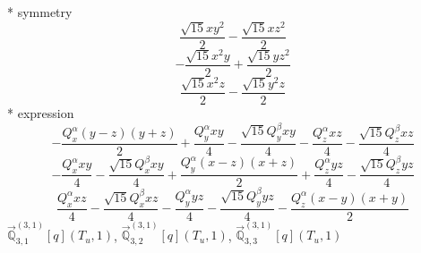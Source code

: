 \documentclass[fleqn,8pt]{jsarticle}
\begin{document}
\noindent\quad ** symmetry
\begin{dmath*}
\frac{\sqrt{15} x y^{2}}{2} - \frac{\sqrt{15} x z^{2}}{2}
\end{dmath*}
\begin{dmath*}
- \frac{\sqrt{15} x^{2} y}{2} + \frac{\sqrt{15} y z^{2}}{2}
\end{dmath*}
\begin{dmath*}
\frac{\sqrt{15} x^{2} z}{2} - \frac{\sqrt{15} y^{2} z}{2}
\end{dmath*}
\noindent\quad ** expression
\begin{dmath*}
- \frac{Q_{x}^{\alpha} \left(y - z\right) \left(y + z\right)}{2} + \frac{Q_{y}^{\alpha} x y}{4} - \frac{\sqrt{15} Q_{y}^{\beta} x y}{4} - \frac{Q_{z}^{\alpha} x z}{4} - \frac{\sqrt{15} Q_{z}^{\beta} x z}{4}
\end{dmath*}
\begin{dmath*}
- \frac{Q_{x}^{\alpha} x y}{4} - \frac{\sqrt{15} Q_{x}^{\beta} x y}{4} + \frac{Q_{y}^{\alpha} \left(x - z\right) \left(x + z\right)}{2} + \frac{Q_{z}^{\alpha} y z}{4} - \frac{\sqrt{15} Q_{z}^{\beta} y z}{4}
\end{dmath*}
\begin{dmath*}
\frac{Q_{x}^{\alpha} x z}{4} - \frac{\sqrt{15} Q_{x}^{\beta} x z}{4} - \frac{Q_{y}^{\alpha} y z}{4} - \frac{\sqrt{15} Q_{y}^{\beta} y z}{4} - \frac{Q_{z}^{\alpha} \left(x - y\right) \left(x + y\right)}{2}
\end{dmath*}
\noindent\quad $\vec{\mathbb{Q}}_{3,1}^{(3,1)}[q](T_{u},1)$, $\vec{\mathbb{Q}}_{3,2}^{(3,1)}[q](T_{u},1)$, $\vec{\mathbb{Q}}_{3,3}^{(3,1)}[q](T_{u},1)$
\end{document}
